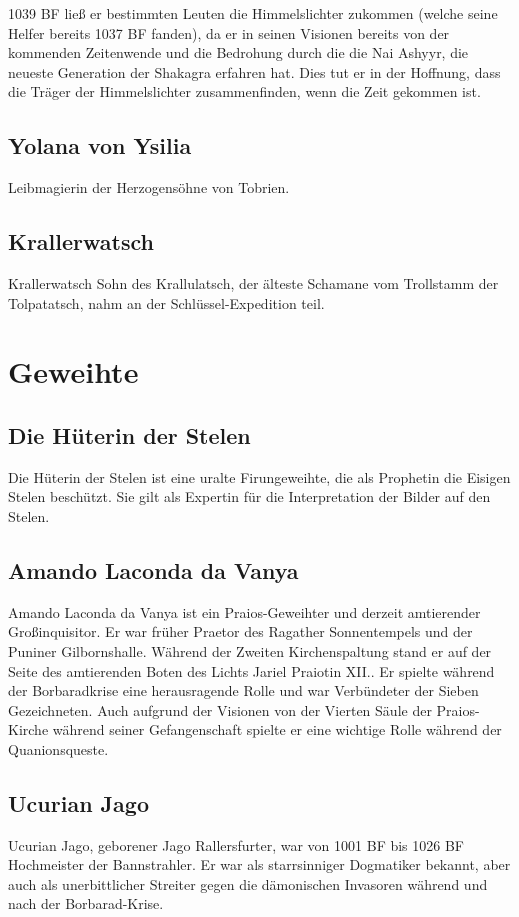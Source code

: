 1039 BF ließ er bestimmten Leuten die Himmelslichter zukommen (welche seine Helfer bereits 1037 BF fanden), da er in seinen Visionen bereits von der kommenden Zeitenwende und die Bedrohung durch die die Nai Ashyyr, die neueste Generation der Shakagra erfahren hat. Dies tut er in der Hoffnung, dass die Träger der Himmelslichter zusammenfinden, wenn die Zeit gekommen ist. 

\subsection{Yolana von Ysilia}
Leibmagierin der Herzogensöhne von Tobrien.

\subsection{Krallerwatsch}
Krallerwatsch Sohn des Krallulatsch, der älteste Schamane vom Trollstamm der Tolpatatsch, nahm an der Schlüssel-Expedition teil. 

\section{Geweihte}

\subsection{Die Hüterin der Stelen}
Die Hüterin der Stelen ist eine uralte Firungeweihte, die als Prophetin die Eisigen Stelen beschützt. Sie gilt als Expertin für die Interpretation der Bilder auf den Stelen.

\subsection{Amando Laconda da Vanya}
Amando Laconda da Vanya ist ein Praios-Geweihter und derzeit amtierender Großinquisitor. Er war früher Praetor des Ragather Sonnentempels und der Puniner Gilbornshalle. Während der Zweiten Kirchenspaltung stand er auf der Seite des amtierenden Boten des Lichts Jariel Praiotin XII.. Er spielte während der Borbaradkrise eine herausragende Rolle und war Verbündeter der Sieben Gezeichneten. Auch aufgrund der Visionen von der Vierten Säule der Praios-Kirche während seiner Gefangenschaft spielte er eine wichtige Rolle während der Quanionsqueste. 

\subsection{Ucurian Jago}
Ucurian Jago, geborener Jago Rallersfurter, war von 1001 BF bis 1026 BF Hochmeister der Bannstrahler. Er war als starrsinniger Dogmatiker bekannt, aber auch als unerbittlicher Streiter gegen die dämonischen Invasoren während und nach der Borbarad-Krise.


